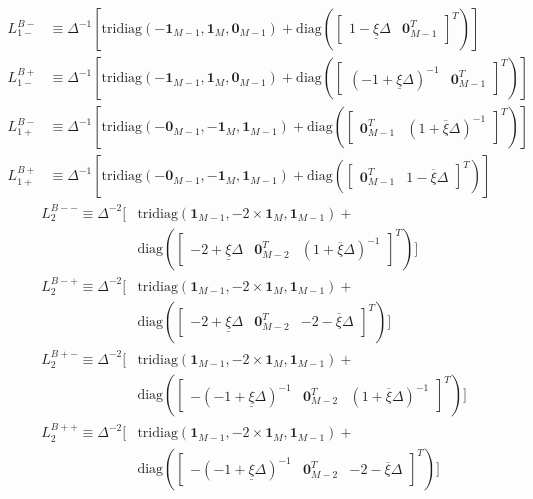 \documentclass[11pt]{article}
\newcommand{\diag}{\ensuremath{\mathrm{diag}}}
\theoremstyle{definition}
\begin{document}
\begin{align}
L_{1-}^{B-} &\equiv \Delta^{-1}
\left[ 
\text{tridiag}(-\mathbf{1}_{M-1}, 
\mathbf{1}_{M}, \mathbf{0}_{M-1} ) + \diag \left( \begin{bmatrix}
1 - \underline{\xi} \Delta &
\mathbf{0}_{M-1}^T 
\end{bmatrix}^T
\right)
\right] \\
L_{1-}^{B+} &\equiv \Delta^{-1}
\left[ 
\text{tridiag}(-\mathbf{1}_{M-1}, 
\mathbf{1}_{M}, \mathbf{0}_{M-1} ) + \diag \left( \begin{bmatrix}
(-1+\underline{\xi} \Delta)^{-1} &
\mathbf{0}_{M-1}^T 
\end{bmatrix}^T
\right)
\right] 
\end{align}
\begin{align}
L_{1+}^{B-} &\equiv 
\Delta^{-1}
\left[ 
\text{tridiag}(-\mathbf{0}_{M-1}, 
\mathbf{-1}_{M}, \mathbf{1}_{M-1} ) + \diag \left( \begin{bmatrix}
\mathbf{0}_{M-1}^T &
(1+\overline{\xi} \Delta)^{-1}
\end{bmatrix}^T
\right)
\right] \\
L_{1+}^{B+} &\equiv 
\Delta^{-1}
\left[ 
\text{tridiag}(-\mathbf{0}_{M-1}, 
\mathbf{-1}_{M}, \mathbf{1}_{M-1} ) + \diag \left( \begin{bmatrix}
\mathbf{0}_{M-1}^T &
1- \overline{\xi} \Delta
\end{bmatrix}^T
\right)
\right]
\end{align}
\begin{align}
L_2^{B--} \equiv  \Delta^{-2} 
\Big[ 
&\text{tridiag}(
\mathbf{1}_{M-1},
-2 \times \mathbf{1}_M,
\mathbf{1}_{M-1} )
+ \\
&\diag \left( \begin{bmatrix}
-2 + \underline{\xi}\Delta &
\mathbf{0}_{M-2}^T &
(1+\overline{\xi} \Delta)^{-1}
\end{bmatrix}^T \right)
\Big] \\
L_2^{B-+} \equiv  \Delta^{-2} 
\Big[ 
&\text{tridiag}(
\mathbf{1}_{M-1},
-2 \times \mathbf{1}_M,
\mathbf{1}_{M-1} )
+  \\
&\diag \left( \begin{bmatrix}
-2 + \underline{\xi}\Delta &
\mathbf{0}_{M-2}^T &
-2 - \overline{\xi}\Delta
\end{bmatrix}^T \right)
\Big] \\
L_2^{B+-} \equiv  \Delta^{-2} 
\Big[ 
&\text{tridiag}(
\mathbf{1}_{M-1},
-2 \times \mathbf{1}_M,
\mathbf{1}_{M-1} )
+ \\
&\diag \left( \begin{bmatrix}
-(-1+\underline{\xi} \Delta)^{-1}&
\mathbf{0}_{M-2}^T &
(1+\overline{\xi} \Delta)^{-1}
\end{bmatrix}^T \right)
\Big] \\
L_2^{B++} \equiv  \Delta^{-2} 
\Big[ 
&\text{tridiag}(
\mathbf{1}_{M-1},
-2 \times \mathbf{1}_M,
\mathbf{1}_{M-1} )
+  \\
&\diag \left( \begin{bmatrix}
-(-1+\underline{\xi} \Delta)^{-1}&
\mathbf{0}_{M-2}^T &
-2 - \overline{\xi}\Delta
\end{bmatrix}^T \right)
\Big]
\end{align}
\end{document}
